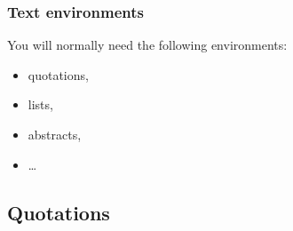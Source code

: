 
\begin{frame}[fragile]
\frametitle{Text environments}
You will normally need the following environments:

\begin{itemize}
	\item quotations,
	
	\item lists, 
	
	
	\item abstracts,
	
	\item \dots 
\end{itemize}

\end{frame}


\subsection{Quotations}

